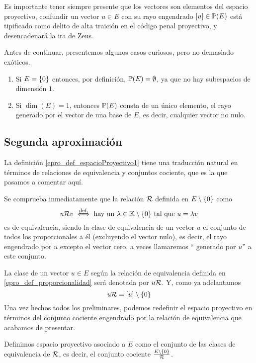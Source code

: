 Es importante tener siempre presente que los vectores  son elementos del espacio proyectivo, confundir un vector $u\in E$ con su rayo engendrado $\left [ u \right ]\in\mathbb{P}(E)$ está tipificado como delito de alta traición en el código penal proyectivo, y desencadenará la ira de Zeus.
\begin{obs}
	\label{epro_obs_casosExtremos}
	Antes de continuar, presentemos algunos casos curiosos, pero no demasiado exóticos.
	\begin{enumerate}
		\item Si $E=\{0\}$ entonces, por definición, $\mathbb{P}(E)=\emptyset$, ya que no hay subespacios de dimensión $1$.
		\item Si $\dim(E)=1$, entonces $\mathbb{P}(E)$ consta de un único elemento, el rayo generado por el vector de una base de $E$, es decir, cualquier vector no nulo.\qedhere
	\end{enumerate}
\end{obs}
\subsection{Segunda aproximación}
La definición \ref{epro_def_espacioProyectivo1} tiene una traducción natural en términos de relaciones de equivalencia y conjuntos cociente, que es la que pasamos a comentar aquí.
\begin{defi}
	\label{epro_def_proporcionalidad}
	Se comprueba inmediatamente que la relación $\mathcal{R}$ definida en $E\setminus\{0\}$ como
	\begin{equation*}
		u\mathcal{R}v\stackrel{\textrm{def.}}{\iff} \text{hay un } \lambda\in\mathbb{K}\setminus\{0\}\text{ tal que } u = \lambda v
	\end{equation*}
	es de equivalencia, siendo la clase de equivalencia de un vector $u$ el conjunto de todos los proporcionales a él (excluyendo el vector nulo), es decir, el rayo engendrado por $u$ excepto el vector cero, a veces llamaremos `` generado por $u$'' a este conjunto.
\end{defi}
La clase de un vector $u\in E$ según la relación de equivalencia definida en \ref{epro_def_proporcionalidad} será denotada por $u\mathcal{R}$. Y, como ya adelantamos
\begin{equation*}
	u\mathcal{R}=\left [ u \right ]\setminus\{0\}
\end{equation*}
Una vez hechos todos los preliminares, podemos redefinir el espacio proyectivo en términos del conjunto cociente engendrado por la relación de equivalencia que acabamos de presentar.
\begin{defi}
	\label{epro_def_espacioProyectivo2}
	Definimos espacio proyectivo asociado a $E$ como el conjunto de las clases de equivalencia de $\mathcal{R}$, es decir, el conjunto cociente $\frac{E\setminus\{0\}}{\mathcal{R}}$.
\end{defi}
